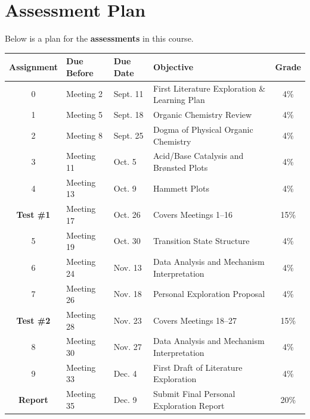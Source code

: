 \section{Assessment Plan}

Below is a plan for the \textbf{assessments} in this course.

\begin{longtable}{cp{2cm}p{2cm}p{7cm}c}
\toprule
Assignment & Due Before & Due Date & Objective & Grade \\
\midrule
0 & Meeting 2 & Sept. 11 & First Literature Exploration \& Learning Plan & 4\% \\
1 & Meeting 5 & Sept. 18 & Organic Chemistry Review & 4\% \\
2 & Meeting 8 & Sept. 25 & Dogma of Physical Organic Chemistry & 4\% \\
3 & Meeting 11 & Oct. 5 & Acid/Base Catalysis and Brønsted Plots & 4\% \\
4 & Meeting 13 & Oct. 9 & Hammett Plots & 4\% \\
\textbf{Test \#1} & Meeting 17 & Oct. 26 & Covers Meetings 1--16 & 15\% \\
5 & Meeting 19 & Oct. 30 & Transition State Structure & 4\% \\
6 & Meeting 24 & Nov. 13 & Data Analysis and Mechanism Interpretation & 4\% \\
7 & Meeting 26 & Nov. 18 & Personal Exploration Proposal & 4\% \\
\textbf{Test \#2} & Meeting 28 & Nov. 23 & Covers Meetings 18--27 & 15\% \\
8 & Meeting 30 & Nov. 27 & Data Analysis and Mechanism Interpretation & 4\% \\
9 & Meeting 33 & Dec. 4 & First Draft of Literature Exploration & 4\% \\
\textbf{Report} & Meeting 35 & Dec. 9 & Submit Final Personal Exploration Report & 20\% \\
\bottomrule
\end{longtable}


